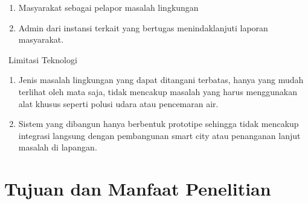 \begin{enumerate}
        \begin{enumerate}
            \item Masyarakat sebagai pelapor masalah lingkungan 
            \item Admin dari instansi terkait yang bertugas menindaklanjuti laporan masyarakat. 
        \end{enumerate}
    \ Limitasi Teknologi 
        \begin{enumerate}
            \item Jenis masalah lingkungan yang dapat ditangani terbatas, hanya yang mudah terlihat oleh mata saja, tidak mencakup masalah yang harus menggunakan alat khusus seperti polusi udara atau pencemaran air. 
            \item Sistem yang dibangun hanya berbentuk prototipe sehingga tidak mencakup integrasi langsung dengan pembangunan smart city atau penanganan lanjut masalah di lapangan. 
        \end{enumerate}
 \end{enumerate}

 \section{Tujuan dan Manfaat Penelitian}
 

